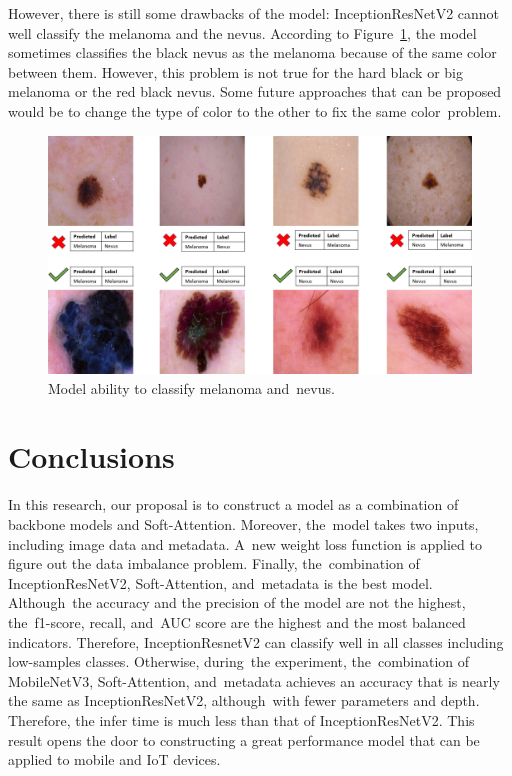 \documentclass[sensors,article,accept,pdftex,moreauthors]{Definitions/mdpi}
\begin{document}
However, there is still some drawbacks of the model: InceptionResNetV2 cannot well classify the melanoma and the nevus. According to Figure~\ref{fig:nevusVSmela}, the model sometimes classifies the black nevus as the melanoma because of the same color between them. However, this problem is not true for the hard black or big melanoma or the red black nevus. Some future approaches that can be proposed would be to change the type of color to the other to fix the same color~problem.

\begin{figure}[H]
	\includegraphics[width=0.9\linewidth]{Definitions/img_class_nevus_mela}
	\caption{Model ability to classify melanoma and~nevus.}
	\label{fig:nevusVSmela}
\end{figure}
\unskip

\section{Conclusions}
In this research, our proposal is to construct a model as a combination of backbone models and Soft-Attention. Moreover, the~model takes two inputs, including image data and metadata. A~new weight loss function is applied to figure out the data imbalance problem. Finally, the~combination of InceptionResNetV2, Soft-Attention, and~metadata is the best model. Although~the accuracy and the precision of the model are not the highest, the~f1-score, recall, and~AUC score are the highest and the most balanced indicators. Therefore, InceptionResnetV2 can classify well in all classes including low-samples classes. Otherwise, during~the experiment, the~combination of MobileNetV3, Soft-Attention, and~metadata achieves an accuracy that is nearly the same as InceptionResNetV2, although~with fewer  parameters and depth. Therefore, the infer time is much less than that of InceptionResNetV2. This result opens the door to constructing a great performance model that can be applied to mobile and IoT devices.  
\vspace{6pt} 
\end{document}
